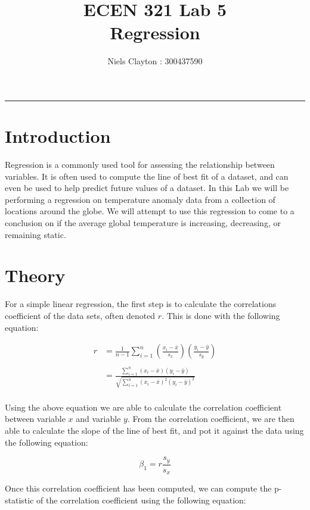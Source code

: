\documentclass[a4paper,11pt]{article}
\begin{document}
\begin{preview}
\title{\LARGE{\textbf{ECEN 321 Lab 5\\}}Regression}
\author{Niels Clayton : 300437590}
\date{}
\maketitle
\hrule

\section*{Introduction}

Regression is a commonly used tool for assessing the relationship between variables. It is often used to compute the line of best fit of a dataset, and can even be used to help predict future values of a dataset. In this Lab we will be performing a regression on temperature anomaly data from a collection of locations around the globe. We will attempt to use this regression to come to a conclusion on if the average global temperature is increasing, decreasing, or remaining static.

\section*{Theory}

For a simple linear regression, the first step is to calculate the correlations coefficient of the data sets, often denoted $r$. This is done with the following equation:

\begin{align*}
    r &= \frac{1}{n-1}\sum_{i = 1}^{n} \left(\frac{x_i-\bar{x}}{s_x} \right) \left(\frac{y_i-\bar{y}}{s_y}\right)\\\\
      &= \frac{\sum_{i = 1}^{n}  (x_i - \bar{x})(y_i - \bar{y})  }{\sqrt{\sum_{i = 1}^{n}  (x_i - \bar{x})^2(y_i - \bar{y})^2 }}\\
\end{align*}

Using the above equation we are able to calculate the correlation coefficient between variable $x$ and variable $y$. From the correlation coefficient, we are then able to calculate the slope of the line of best fit, and pot it against the data using the following equation:

$$ \beta_1 = r \frac{s_y}{s_x} $$

Once this correlation coefficient has been computed, we can compute the p-statistic of the correlation coefficient using the following equation:\\


\end{preview}
\end{document}
